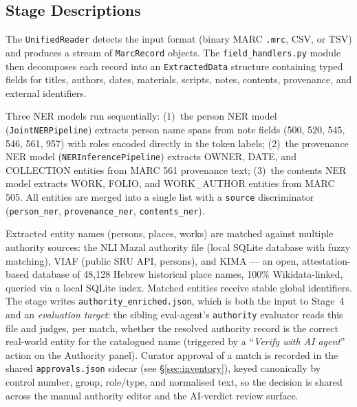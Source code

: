 \documentclass[12pt]{article}
\newcommand{\code}[1]{\texttt{#1}}
\begin{document}
\subsection{Stage Descriptions}

\begin{description}[style=nextline, leftmargin=2cm]
\item[Stage 1: MARC Input Parsing]
  The \code{UnifiedReader} detects the input format (binary MARC \code{.mrc}, CSV, or TSV) and produces a stream of \code{MarcRecord} objects. The \code{field\_handlers.py} module then decomposes each record into an \code{ExtractedData} structure containing typed fields for titles, authors, dates, materials, scripts, notes, contents, provenance, and external identifiers.

\item[Stage 2: NER Extraction]
  Three NER models run sequentially: (1)~the person NER model (\code{JointNERPipeline}) extracts person name spans from note fields (500, 520, 545, 546, 561, 957) with roles encoded directly in the token labels; (2)~the provenance NER model (\code{NERInferencePipeline}) extracts OWNER, DATE, and COLLECTION entities from MARC 561 provenance text; (3)~the contents NER model extracts WORK, FOLIO, and WORK\_AUTHOR entities from MARC 505. All entities are merged into a single list with a \code{source} discriminator (\code{person\_ner}, \code{provenance\_ner}, \code{contents\_ner}).

\item[Stage 3: Authority Resolution]
  Extracted entity names (persons, places, works) are matched against multiple authority sources: the NLI Mazal authority file (local SQLite database with fuzzy matching), VIAF (public SRU API, persons), and KIMA --- an open, attestation-based database of 48,128 Hebrew historical place names, 100\% Wikidata-linked, queried via a local SQLite index. Matched entities receive stable global identifiers. The stage writes \code{authority\_enriched.json}, which is both the input to Stage~4 and an \emph{evaluation target}: the sibling eval-agent's \code{authority} evaluator reads this file and judges, per match, whether the resolved authority record is the correct real-world entity for the catalogued name (triggered by a ``\emph{Verify with AI agent}'' action on the Authority panel). Curator approval of a match is recorded in the shared \code{approvals.json} sidecar (see \S\ref{sec:inventory}), keyed canonically by control number, group, role/type, and normalised text, so the decision is shared across the manual authority editor and the AI-verdict review surface.


\end{description}
\end{document}
